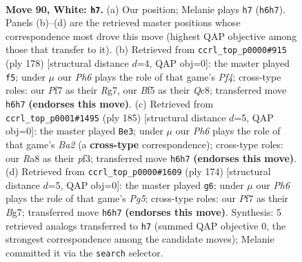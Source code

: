 \documentclass[11pt]{article}
\begin{document}
\clearpage

\begin{figure}[p]\centering
\begin{subfigure}{0.46\textwidth}\centering
\resizebox{\linewidth}{!}{%
\newchessgame
\chessboard[
  setfen={R7/5P2/7P/2k2B2/8/8/8/7K w - - 1 90},
  showmover=false,
  pgfstyle=straightmove, color=movearrow, markmove={h6-h7}
]}
\caption{}
\end{subfigure}\hfill
\begin{subfigure}{0.46\textwidth}\centering
\resizebox{\linewidth}{!}{%
\newchessgame
\chessboard[
  setfen={2Q5/6R1/8/8/k4P2/3K4/8/8 w - - 1 90},
  showmover=false,
  pgfstyle=straightmove, color=movearrow, markmove={f4-f5}
]}
\caption{}
\end{subfigure}
\\[4pt]
\begin{subfigure}{0.46\textwidth}\centering
\resizebox{\linewidth}{!}{%
\newchessgame
\chessboard[
  setfen={3k4/b7/8/4p3/8/5P2/B7/4K3 b - - 8 93},
  showmover=false,
  pgfstyle=straightmove, color=movearrow, markmove={a7-e3}
]}
\caption{}
\end{subfigure}\hfill
\begin{subfigure}{0.46\textwidth}\centering
\resizebox{\linewidth}{!}{%
\newchessgame
\chessboard[
  setfen={4k3/6B1/8/5bP1/8/8/8/2K5 w - - 7 88},
  showmover=false,
  pgfstyle=straightmove, color=movearrow, markmove={g5-g6}
]}
\caption{}
\end{subfigure}
\caption{\textbf{Move 90, White: \texttt{h7}.} (a) Our position; Melanie plays \texttt{h7} (\texttt{h6h7}). Panels (b)--(d) are the retrieved master positions whose correspondence most drove this move (highest QAP objective among those that transfer to it). (b) Retrieved from \texttt{ccrl\_top\_p0000\#915} (ply 178) [structural distance $d$=4, QAP obj=0]: the master played \texttt{f5}; under $\mu$ our \emph{Ph6} plays the role of that game's \emph{Pf4}; cross-type roles: our \emph{P}f7 as their \emph{R}g7, our \emph{B}f5 as their \emph{Q}c8; transferred move \texttt{h6h7} \textbf{(endorses this move)}. (c) Retrieved from \texttt{ccrl\_top\_p0001\#1495} (ply 185) [structural distance $d$=5, QAP obj=0]: the master played \texttt{Be3}; under $\mu$ our \emph{Ph6} plays the role of that game's \emph{Ba2} (a \textbf{cross-type} correspondence); cross-type roles: our \emph{R}a8 as their \emph{p}f3; transferred move \texttt{h6h7} \textbf{(endorses this move)}. (d) Retrieved from \texttt{ccrl\_top\_p0000\#1609} (ply 174) [structural distance $d$=5, QAP obj=0]: the master played \texttt{g6}; under $\mu$ our \emph{Ph6} plays the role of that game's \emph{Pg5}; cross-type roles: our \emph{P}f7 as their \emph{B}g7; transferred move \texttt{h6h7} \textbf{(endorses this move)}. Synthesis: 5 retrieved analogs transferred to \texttt{h7} (summed QAP objective 0, the strongest correspondence among the candidate moves); Melanie committed it via the \texttt{search} selector.}
\label{fig:thought-m178}
\end{figure}
\end{document}
